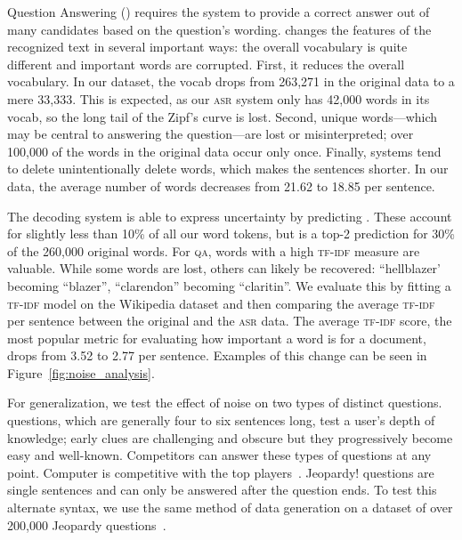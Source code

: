 Question Answering () requires the system to provide a correct answer out of many candidates based on the question's wording. 
%
\asr{} changes the features of the recognized text in several important ways: the overall vocabulary is quite different and important words are corrupted.
%
First, it reduces the overall vocabulary.  
%
In our dataset, the vocab drops from 263,271 in the original data to a mere 33,333.
%
This is expected, as our \textsc{asr} system only has 42,000 words in its vocab, so the long tail of the Zipf's curve is lost.
%
Second, unique words---which may be central to answering the question---are lost or misinterpreted; over 100,000 of the words in the original data occur only once.
%
Finally, \asr{} systems tend to delete unintentionally delete words, which makes the sentences shorter.  In our \qb{} data, the average number of words decreases from 21.62 to 18.85 per sentence.

The decoding system is able to express uncertainty by predicting \unk{}.
%
These account for slightly less than 10\% of all our word tokens, but is a top-2 prediction for 30\% of the 260,000 original words.
%
For \textsc{qa}, words with a high \textsc{tf-idf} measure are valuable.
While some words are lost, others can likely be recovered: ``hellblazer' becoming ``blazer'', ``clarendon'' becoming ``claritin''.
%
We evaluate this by fitting a \textsc{tf-idf} model on the Wikipedia dataset and then comparing the average \textsc{tf-idf} per sentence between the original and the \textsc{asr} data.  
%
The average \textsc{tf-idf} score, the most popular metric for evaluating how important a word is for a document, drops from 3.52 to 2.77 per sentence.
%
Examples of this change can be seen in Figure~\ref{fig:noise_analysis}.

For generalization, we test the effect of noise on two types of distinct questions.  
%
\qb{} questions, which are generally four to six sentences long, test a user's depth of knowledge; early clues are challenging and obscure but they progressively become easy and well-known.  
%
Competitors can answer these types of questions at any point.
%
Computer  is competitive with the top players~\citep{yamada2018studio}. 
%
Jeopardy! questions are single sentences and can only be answered after the question ends.  To test this alternate syntax, we use the same method of data generation on a dataset of over 200,000 Jeopardy questions~\citep{Dunn2017SearchQAAN}.







